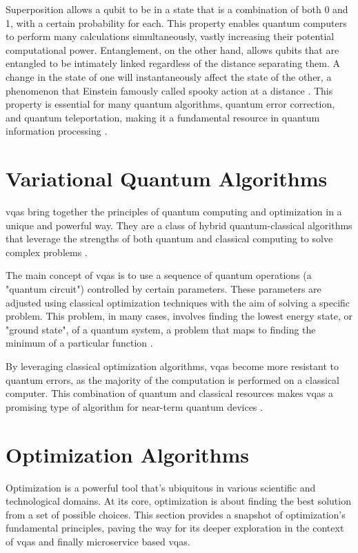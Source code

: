 \documentclass[
  a4paper,  %
  twoside,  %
  bibliography=totoc,
  headsepline,
  cleardoublepage=empty,
  parskip=half,
  draft=false
]{scrbook}
\begin{document}
Superposition allows a qubit to be in a state that is a combination of both 0 and 1, with a certain probability for each.
This property enables quantum computers to perform many calculations simultaneously, vastly increasing their potential computational power.
Entanglement, on the other hand, allows qubits that are entangled to be intimately linked regardless of the distance separating them.
A change in the state of one will instantaneously affect the state of the other, a phenomenon that Einstein famously called spooky action at a distance \cite{Einstein1935}.
This property is essential for many quantum algorithms, quantum error correction, and quantum teleportation, making it a fundamental resource in quantum information processing \cite{Nielsen2010,Preskill1998}.


\section{Variational Quantum Algorithms}
\label{sec:variationalQuantumAlgorithms}

\glspl{vqa} bring together the principles of quantum computing and optimization in a unique and powerful way.
They are a class of hybrid quantum-classical algorithms that leverage the strengths of both quantum and classical computing to solve complex problems \cite{McClean2016}.

The main concept of \glspl{vqa} is to use a sequence of quantum operations (a "quantum circuit") controlled by certain parameters.
These parameters are adjusted using classical optimization techniques with the aim of solving a specific problem.
This problem, in many cases, involves finding the lowest energy state, or "ground state", of a quantum system, a problem that maps to finding the minimum of a particular function \cite{Peruzzo2013}.

By leveraging classical optimization algorithms, \glspl{vqa} become more resistant to quantum errors, as the majority of the computation is performed on a classical computer.
This combination of quantum and classical resources makes \glspl{vqa} a promising type of algorithm for near-term quantum devices \cite{Moll2017}.


\section{Optimization Algorithms}
\label{sec:optimizationAlgorithms}
Optimization is a powerful tool that's ubiquitous in various scientific and technological domains.
At its core, optimization is about finding the best solution from a set of possible choices.
This section provides a snapshot of optimization's fundamental principles, paving the way for its deeper exploration in the context of \glspl{vqa} and finally microservice based \glspl{vqa}.
\end{document}
